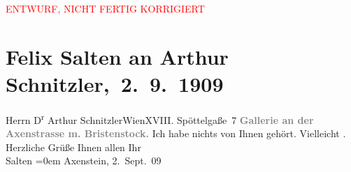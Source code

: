 
\begin{center}
            \textcolor{red}{ENTWURF, NICHT FERTIG KORRIGIERT}
                      \end{center}
            
         
         \renewcommand{\erwaehntePersonen}{Personen: Felix Salten}
         \renewcommand{\erwaehnteOrte}{Orte: Axenstein, Axenstraße, Bristen, Edmund-Weiß-Gasse 7, Morschach, Salzburg, Wien}
         \renewcommand{\erwaehnteWerke}{}
               \section[ Felix Salten an Arthur Schnitzler, 2. 9. 1909]{ Felix Salten an Arthur Schnitzler, 2. 9. 1909}\nopagebreak{}\rehead{ }\begin{ledgroupsized}[t]{13cm}\normalsize\beginnumbering \toendnotes[C]{\smallbreak\pagebreak[2]} 
\toendnotes[C]{\smallbreak}\pstart{}{\pb}Herrn D\textsuperscript{r} Arthur Schnitzler\pend{}\pstart{}Wien\pend{}\pstart{}XVIII. Spöttelgaße 7\pend{}{\bigskip}\pstart
           \noindent{}\centering{}{\pb}\textcolor{gray}{\textbf{Gallerie an der Axenstrasse m. Bristenstock.}}\pend
           \pstart
           {\pb}Ich habe nichts von Ihnen
               gehört. Vielleicht \label{K_L03508-1v}\label{K_L03508-1h}. Herzliche Grüße Ihnen allen\pend
           \pstart
           Ihr {\\[\baselineskip]}\spacefill\mbox{Salten}\pend
           \leftskip=0em{}\pstart
           Axenstein, 2. Sept. 09\pend
           
         
         \endnumbering{}\end{ledgroupsized}  \newcommand{\dateiname}{L03508}\newcommand{\titel}{Felix Salten an Arthur Schnitzler, 2. 9. 1909}\newcommand{\editorInnen}{Martin Anton Müller und Laura Untner}
      